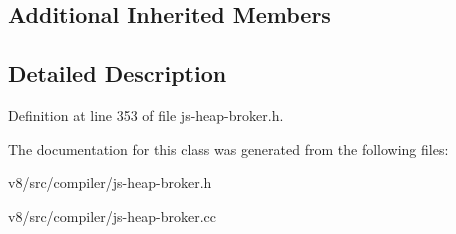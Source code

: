 \subsection*{Additional Inherited Members}


\subsection{Detailed Description}


Definition at line 353 of file js-\/heap-\/broker.\+h.



The documentation for this class was generated from the following files\+:\begin{DoxyCompactItemize}
\item 
v8/src/compiler/js-\/heap-\/broker.\+h\item 
v8/src/compiler/js-\/heap-\/broker.\+cc\end{DoxyCompactItemize}
